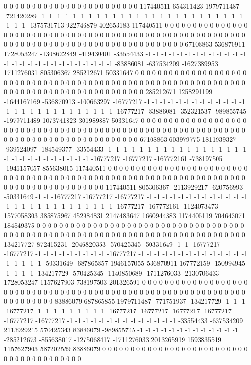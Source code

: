 0 0 0 0 0 0 0 0 0 0 0 0 0 0 0 0 0 0 0 0 0 0 0 0 117440511 654311423 1979711487 -721420289 -1 -1 -1 -1 -1 -1 -1 -1 -1 -1 -1 -1 -1 -1 -1 -1 -1 -1 -1 -1 -1 -1 -1 -1 -1 -1 -1 -1 -1 -1375731713 922746879 402653183 117440511 0 0 0 0 0 0 0 0 0 0 0 0 0 0 0 0 0 0 0 0 0 0 0 0 0 0 0 0 0 0 0 0 0 0 0 0 0 0 0 0 0 0 0 0 0 0 0 0 0 0 0 0 0 0 0 0 0 0 0 0 0 0 0 0 0 0 0
0 0 0 0 0 0 0 0 0 0 0 0 0 0 0 0 0 0 0 0 0 0 0 67108863 536870911 1728053247 -1308622849 -419430401 -33554433 -1 -1 -1 -1 -1 -1 -1 -1 -1 -1 -1 -1 -1 -1 -1 -1 -1 -1 -1 -1 -1 -1 -1 -1 -1 -1 -1 -83886081 -637534209 -1627389953 1711276031 805306367 285212671 50331647 0 0 0 0 0 0 0 0 0 0 0 0 0 0 0 0 0 0 0 0 0 0 0 0 0 0 0 0 0 0 0 0 0 0 0 0 0 0 0 0 0 0 0 0 0 0 0 0 0 0 0 0 0 0 0 0 0 0 0 0 0 0 0 0 0
0 0 0 0 0 0 0 0 0 0 0 0 0 0 0 0 0 0 0 0 0 0 0 285212671 1258291199 -1644167169 -536870913 -100663297 -16777217 -1 -1 -1 -1 -1 -1 -1 -1 -1 -1 -1 -1 -1 -1 -1 -1 -1 -1 -1 -1 -1 -1 -1 -1 -1 -1 -1 -16777217 -83886081 -352321537 -989855745 -1979711489 1073741823 301989887 50331647 0 0 0 0 0 0 0 0 0 0 0 0 0 0 0 0 0 0 0 0 0 0 0 0 0 0 0 0 0 0 0 0 0 0 0 0 0 0 0 0 0 0 0 0 0 0 0 0 0 0 0 0 0 0 0 0 0 0 0 0 0 0 0 0
0 0 0 0 0 0 0 0 0 0 0 0 0 0 0 0 0 0 0 0 0 0 67108863 603979775 1811939327 -939524097 -184549377 -33554433 -1 -1 -1 -1 -1 -1 -1 -1 -1 -1 -1 -1 -1 -1 -1 -1 -1 -1 -1 -1 -1 -1 -1 -1 -1 -1 -1 -1 -1 -16777217 -16777217 -167772161 -738197505 -1946157057 855638015 117440511 0 0 0 0 0 0 0 0 0 0 0 0 0 0 0 0 0 0 0 0 0 0 0 0 0 0 0 0 0 0 0 0 0 0 0 0 0 0 0 0 0 0 0 0 0 0 0 0 0 0 0 0 0 0 0 0 0 0 0 0 0 0 0 0
0 0 0 0 0 0 0 0 0 0 0 0 0 0 0 0 0 0 0 0 0 0 117440511 805306367 -2113929217 -620756993 -50331649 -1 -1 -16777217 -16777217 -16777217 -1 -1 -1 -1 -1 -1 -1 -1 -1 -1 -1 -1 -1 -1 -1 -1 -1 -1 -1 -1 -1 -1 -1 -1 -1 -1 -1 -16777217 -167772161 -1124073473 1577058303 385875967 452984831 2147483647 1660944383 1174405119 704643071 184549375 0 0 0 0 0 0 0 0 0 0 0 0 0 0 0 0 0 0 0 0 0 0 0 0 0 0 0 0 0 0 0 0 0 0 0 0 0 0 0 0 0 0 0 0 0 0 0 0 0 0 0 0 0 0 0 0 0 0
0 0 0 0 0 0 0 0 0 0 0 0 0 0 0 0 0 0 0 0 0 0 134217727 872415231 -2046820353 -570425345 -50331649 -1 -1 -16777217 -16777217 -1 -1 -1 -1 -1 -1 -1 -1 -1 -16777217 -1 -1 -1 -1 -1 -1 -1 -1 -1 -1 -1 -1 -1 -1 -1 -1 -1 -1 -1 -50331649 -687865857 1946157055 536870911 167772159 -150994945 -1 -1 -1 -1 -134217729 -570425345 -1140850689 -1711276033 -2130706433 1728053247 1157627903 738197503 201326591 0 0 0 0 0 0 0 0 0 0 0 0 0 0 0 0 0 0 0 0 0 0 0 0 0 0 0 0 0 0 0 0 0 0 0 0 0 0 0 0 0 0 0 0 0 0 0 0 0
0 0 0 0 0 0 0 0 0 0 0 0 0 0 0 0 0 0 0 0 0 0 83886079 687865855 1979711487 -771751937 -134217729 -1 -1 -1 -16777217 -1 -1 -1 -1 -1 -1 -1 -1 -1 -16777217 -16777217 -16777217 -16777217 -16777217 -16777217 -1 -1 -1 -1 -1 -1 -1 -1 -1 -1 -1 -1 -1 -1 -33554433 -637534209 2113929215 570425343 83886079 -989855745 -1 -1 -1 -1 -1 -1 -1 -1 -1 -1 -1 -1 -1 -285212673 -855638017 -1275068417 -1711276033 2013265919 1593835519 1157627903 587202559 83886079 0 0 0 0 0 0 0 0 0 0 0 0 0 0 0 0 0 0 0 0 0 0 0 0 0 0 0 0 0 0 0 0 0 0 0 0 0 0 0 0
